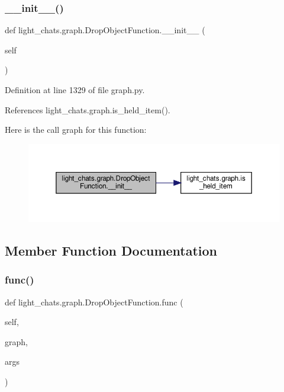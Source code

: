 \subsubsection{\texorpdfstring{\+\_\+\+\_\+init\+\_\+\+\_\+()}{\_\_init\_\_()}}
{\footnotesize\ttfamily def light\+\_\+chats.\+graph.\+Drop\+Object\+Function.\+\_\+\+\_\+init\+\_\+\+\_\+ (\begin{DoxyParamCaption}\item[{}]{self }\end{DoxyParamCaption})}



Definition at line 1329 of file graph.\+py.



References light\+\_\+chats.\+graph.\+is\+\_\+held\+\_\+item().

Here is the call graph for this function\+:
\nopagebreak
\begin{figure}[H]
\begin{center}
\leavevmode
\includegraphics[width=350pt]{classlight__chats_1_1graph_1_1DropObjectFunction_a1afdc7d60d392a4c64764acbd130c13e_cgraph}
\end{center}
\end{figure}


\subsection{Member Function Documentation}
\mbox{\label{classlight__chats_1_1graph_1_1DropObjectFunction_a2df3dbdd3032d47143978e645d12e928}} 
\subsubsection{\texorpdfstring{func()}{func()}}
{\footnotesize\ttfamily def light\+\_\+chats.\+graph.\+Drop\+Object\+Function.\+func (\begin{DoxyParamCaption}\item[{}]{self,  }\item[{}]{graph,  }\item[{}]{args }\end{DoxyParamCaption})}

